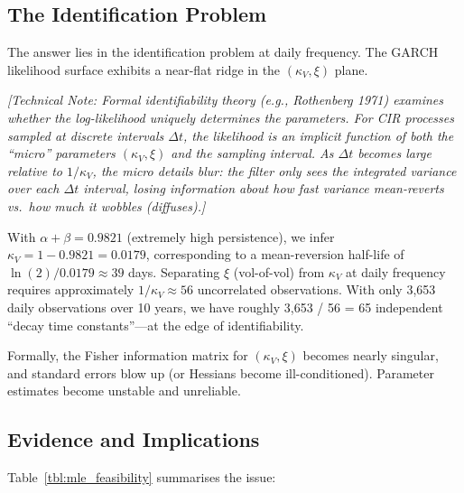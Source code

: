 \documentclass[11pt, a4paper, twoside]{article}
\begin{document}
\subsection{The Identification Problem}

The answer lies in the identification problem at daily frequency. The GARCH likelihood surface exhibits a near-flat ridge in the $(\kappa_V, \xi)$ plane.

\textit{[Technical Note: Formal identifiability theory (e.g., Rothenberg 1971) examines whether the log-likelihood uniquely determines the parameters. For CIR processes sampled at discrete intervals $\Delta t$, the likelihood is an implicit function of both the ``micro'' parameters $(\kappa_V, \xi)$ and the sampling interval. As $\Delta t$ becomes large relative to $1/\kappa_V$, the micro details blur: the filter only sees the integrated variance over each $\Delta t$ interval, losing information about how fast variance mean-reverts vs.\ how much it wobbles (diffuses).]}

With $\alpha + \beta = 0.9821$ (extremely high persistence), we infer $\kappa_V = 1 - 0.9821 = 0.0179$, corresponding to a mean-reversion half-life of $\ln(2) / 0.0179 \approx 39$ days. Separating $\xi$ (vol-of-vol) from $\kappa_V$ at daily frequency requires approximately $1/\kappa_V \approx 56$ uncorrelated observations. With only 3,653 daily observations over 10 years, we have roughly 3,653 / 56 = 65 independent ``decay time constants''---at the edge of identifiability.

Formally, the Fisher information matrix for $(\kappa_V, \xi)$ becomes nearly singular, and standard errors blow up (or Hessians become ill-conditioned). Parameter estimates become unstable and unreliable.

\subsection{Evidence and Implications}

Table~\ref{tbl:mle_feasibility} summarises the issue:
\end{document}
